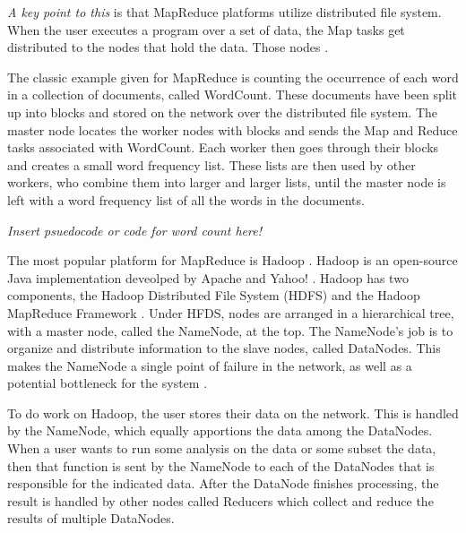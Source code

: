 \documentclass[10pt, conference, compsocconf]{IEEEtran}
\begin{document}
\textit{A key point to this} is that MapReduce platforms utilize distributed file system.  When the user executes a program over a set of data, the Map tasks get distributed to the nodes that hold the data.  Those nodes . 

The classic example given for MapReduce is counting the occurrence of each word in a collection of documents, called WordCount.  These documents have been split up into blocks and stored on the network over the distributed file system.  The master node locates the worker nodes with blocks and sends the Map and Reduce tasks associated with WordCount.  Each worker then goes through their blocks and creates a small word frequency list.  These lists are then used by other workers, who combine them into larger and larger lists, until the master node is left with a word frequency list of all the words in the documents. 

\textit{Insert psuedocode or code for word count here!}

The most popular platform for MapReduce is Hadoop \cite{Hadoop}. Hadoop is an open-source Java implementation deveolped by Apache and Yahoo! \cite{pavlo2009comparison}.  Hadoop has two components, the Hadoop Distributed File System (HDFS) and the Hadoop MapReduce Framework \cite{mrsurvey} \cite{shvachko2010hadoop}.  Under HFDS, nodes are arranged in a hierarchical tree, with a master node, called the NameNode, at the top.  The NameNode's job is to organize and distribute information to the slave nodes, called DataNodes.  This makes the NameNode a single point of failure \cite{shvachko2010hadoop} in the network, as well as a potential bottleneck for the system \cite{hadoop-bottle}.

To do work on Hadoop, the user stores their data on the network.  This is handled by the NameNode, which equally apportions the data among the DataNodes.  When a user wants to run some analysis on the data or some subset the data, then that function is sent by the NameNode to each of the DataNodes that is responsible for the indicated data.   After the DataNode finishes processing, the result is handled by other nodes called Reducers which collect and reduce the results of multiple DataNodes.

\end{document}
